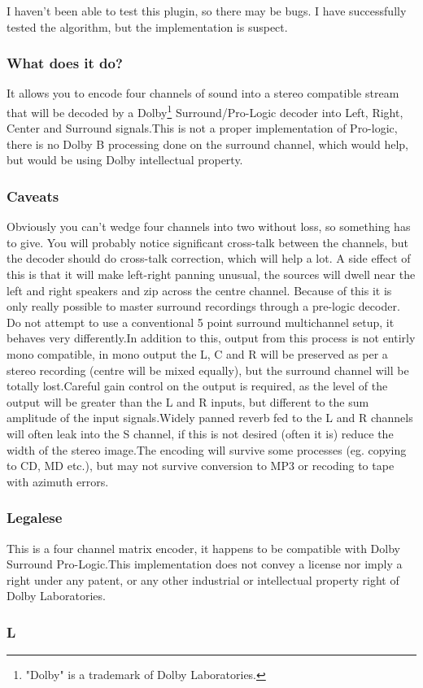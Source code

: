 \documentclass[11pt]{article}
\begin{document}
I haven't been able to test this plugin, so there may be bugs. I have successfully tested the algorithm, but the implementation is suspect.\subsubsection{What does it do?}It allows you to encode four channels of sound into a stereo compatible stream that will be decoded by a Dolby\footnote{"Dolby" is a trademark of Dolby Laboratories.} Surround/Pro-Logic decoder into Left, Right, Center and Surround signals.This is not a proper implementation of Pro-logic, there is no Dolby B processing done on the surround channel, which would help, but would be using Dolby intellectual property.\subsubsection{Caveats}Obviously you can't wedge four channels into two without loss, so something has to give. You will probably notice significant cross-talk between the channels, but the decoder should do cross-talk correction, which will help a lot. A side effect of this is that it will make left-right panning unusual, the sources will dwell near the left and right speakers and zip across the centre channel. Because of this it is only really possible to master surround recordings through a pre-logic decoder. Do not attempt to use a conventional 5 point surround multichannel setup, it behaves very differently.In addition to this, output from this process is not entirly mono compatible, in mono output the L, C and R will be preserved as per a stereo recording (centre will be mixed equally), but the surround channel will be totally lost.Careful gain control on the output is required, as the level of the output will be greater than the L and R inputs, but different to the sum amplitude of the input signals.Widely panned reverb fed to the L and R channels will often leak into the S channel, if this is not desired (often it is) reduce the width of the stereo image.The encoding will survive some processes (eg. copying to CD, MD etc.), but may not survive conversion to MP3 or recoding to tape with azimuth errors.\subsubsection{Legalese}This is a four channel matrix encoder, it happens to be compatible with Dolby Surround Pro-Logic.This implementation does not convey a license nor imply a right under any patent, or any other industrial or intellectual property right of Dolby Laboratories.\subsubsection*{L}
\end{document}
